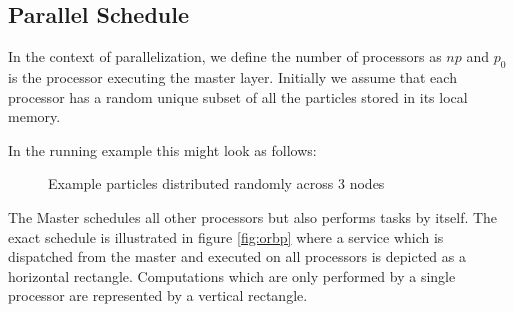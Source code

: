 \documentclass[]{article}
\begin{document}
\subsection{Parallel Schedule}\label{sec:parellize-orb}

In the context of parallelization, we define the number of processors as $np$ and $p_0$ is the processor executing the master layer. 
Initially we assume that each processor has a random unique subset of all the particles stored in its local memory.

In the running example this might look as follows:

\begin{figure}[H]
	
	\centering
	\caption{Example particles distributed randomly across 3 nodes}
\end{figure}

The Master schedules all other processors but also performs tasks by itself. The exact schedule is illustrated in figure \ref{fig:orbp} where a service which is dispatched from the master and executed on all processors is depicted as a horizontal rectangle. Computations which are only performed by a single processor are represented by a vertical rectangle. 
\end{document}
